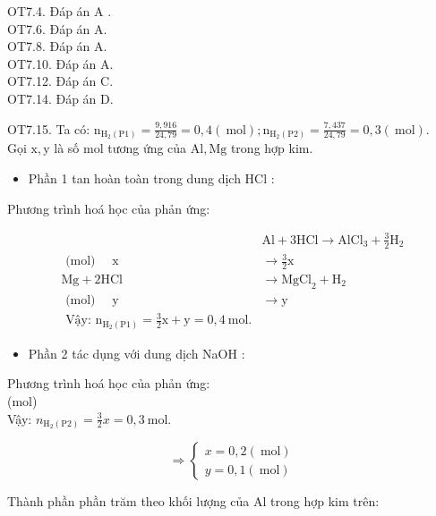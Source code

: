 \documentclass[10pt]{article}
\begin{document}
OT7.4. Đáp án A .\\
OT7.6. Đáp án A.\\
OT7.8. Đáp án A.\\
OT7.10. Đáp án A.\\
OT7.12. Đáp án C.\\
OT7.14. Đáp án D.

OT7.15. Ta có: $\mathrm{n}_{\mathrm{H}_{2}(\mathrm{P} 1)}=\frac{9,916}{24,79}=0,4(\mathrm{~mol}) ; \mathrm{n}_{\mathrm{H}_{2}(\mathrm{P} 2)}=\frac{7,437}{24,79}=0,3(\mathrm{~mol})$.\\
Gọi $\mathrm{x}, \mathrm{y}$ là số mol tương ứng của $\mathrm{Al}, \mathrm{Mg}$ trong hợp kim.

\begin{itemize}
  \item Phần 1 tan hoàn toàn trong dung dịch HCl :
\end{itemize}

Phương trình hoá học của phản ứng:

$$
\begin{array}{ll} 
& \mathrm{Al}+3 \mathrm{HCl} \rightarrow \mathrm{AlCl}_{3}+\frac{3}{2} \mathrm{H}_{2} \\
\text { (mol) } \quad \mathrm{x} \quad & \rightarrow \frac{3}{2} \mathrm{x} \\
\mathrm{Mg}+2 \mathrm{HCl} & \rightarrow \mathrm{MgCl}_{2}+\mathrm{H}_{2} \\
\text { (mol) } \quad \mathrm{y} \quad & \rightarrow \mathrm{y} \\
\text { Vậy: } \mathrm{n}_{\mathrm{H}_{2}(\mathrm{P} 1)}=\frac{3}{2} \mathrm{x}+\mathrm{y}=0,4 \mathrm{~mol} .
\end{array}
$$

\begin{itemize}
  \item Phần 2 tác dụng với dung dịch NaOH :
\end{itemize}

Phương trình hoá học của phản ứng:\\
(mol)\\
Vậy: $n_{\mathrm{H}_{2}(\mathrm{P} 2)}=\frac{3}{2} x=0,3 \mathrm{~mol}$.

$$
\Rightarrow\left\{\begin{array}{l}
x=0,2(\mathrm{~mol}) \\
y=0,1(\mathrm{~mol})
\end{array}\right.
$$

Thành phần phần trăm theo khối lượng của Al trong hợp kim trên:
\end{document}

